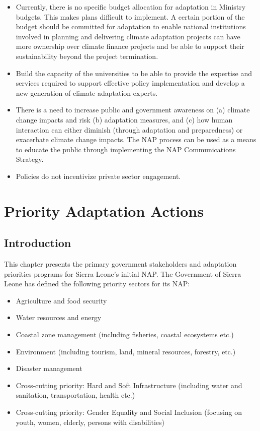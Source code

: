 \documentclass[
]{book}
\providecommand{\tightlist}{%
  \setlength{\itemsep}{0pt}\setlength{\parskip}{0pt}}
\begin{document}
\begin{itemize}
\item
  Currently, there is no specific budget allocation for adaptation in Ministry budgets. This makes plans difficult to implement. A certain portion of the budget should be committed for adaptation to enable national institutions involved in planning and delivering climate adaptation projects can have more ownership over climate finance projects and be able to support their sustainability beyond the project termination.
\item
  Build the capacity of the universities to be able to provide the expertise and services required to support effective policy implementation and develop a new generation of climate adaptation experts.
\item
  There is a need to increase public and government awareness on (a) climate change impacts and risk (b) adaptation measures, and (c) how human interaction can either diminish (through adaptation and preparedness) or exacerbate climate change impacts. The NAP process can be used as a means to educate the public through implementing the NAP Communications Strategy.
\item
  Policies do not incentivize private sector engagement.
\end{itemize}

\hypertarget{priority-adaptation-actions}{%
\chapter{Priority Adaptation Actions}\label{priority-adaptation-actions}}

\hypertarget{introduction-4}{%
\section{Introduction}\label{introduction-4}}

This chapter presents the primary government stakeholders and adaptation priorities programs for Sierra Leone's initial NAP. The Government of Sierra Leone has defined the following priority sectors for its NAP:

\begin{itemize}
\tightlist
\item
  Agriculture and food security
\item
  Water resources and energy
\item
  Coastal zone management (including fisheries, coastal ecosystems etc.)
\item
  Environment (including tourism, land, mineral resources, forestry, etc.)
\item
  Disaster management
\item
  Cross-cutting priority: Hard and Soft Infrastructure (including water and sanitation, transportation, health etc.)
\item
  Cross-cutting priority: Gender Equality and Social Inclusion (focusing on youth, women, elderly, persons with disabilities)
\end{itemize}
\end{document}
